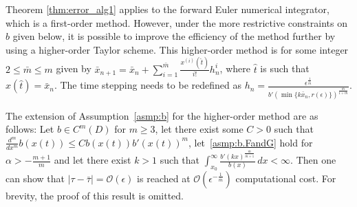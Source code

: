 \documentclass[a4paper, oneside, reqno]{amsart}
\newcommand{\abs}[1]{\left\lvert#1\right\rvert}
\theoremstyle{remark}
\begin{document}
\begin{remark}
\label{rem:ho_sceme}
    Theorem \ref{thm:error_alg1} applies to the forward Euler numerical integrator, which is a first-order method. However, under the more restrictive constraints on $b$ given below, it is possible to improve the efficiency of the method further by using a higher-order Taylor scheme. 
    This higher-order method is for some integer \(2\leq\bar m \leq m\) given by \(\bar x_{n+1} = \bar x_n + \sum_{i=1}^{\bar m}\frac{x^{(i)}(\hat t)}{i!}h^i_{n}\), where \(\hat t\) is such that \(x(\hat t)= \bar x_n\). 
    The time stepping needs to be redefined as \(h_n = \frac{\epsilon^{\frac{1}{\bar m}}}{b'(\min\{k\bar x_n, r(\epsilon)\})^{\frac{\bar m}{1+\bar m}}}\). 

    The extension of Assumption~\ref{asmp:b} for the higher-order method are as follows: 
    Let \(b\in C^m(D)\) for \(m \geq 3\), let there exist some \(C>0\) such that \(\frac{d^m}{dx^m}b(x(t)) \leq Cb(x(t))b'(x(t))^m\), let~\ref{asmp:b.FandG} hold 
    for \(\alpha > -\frac{m+1}{m}\) and let there exist \(k>1\) such that \(\int_{x_0}^{\infty}\frac{b'(kx)^{\frac{\bar m}{\bar m + 1}}}{b(x)}\,dx < \infty\). Then one can show 
    that \(\abs{\tau - \bar\tau} = \mathcal{O}(\epsilon)\) is reached 
    at \(\mathcal{O}\left(\epsilon^{-\frac{1}{\bar m}}\right)\) computational cost. 
    For brevity, the proof of this result is omitted.
\end{remark}
\end{document}
